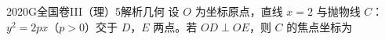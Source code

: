 
\begin{problem}{2020}{G}{全国卷III（理）}{5}{解析几何}
设 $ O $ 为坐标原点，直线 $ x = 2 $ 与抛物线 $ C $：$ y^2 = 2px $（$ p > 0 $）交于 $ D $，$ E $ 两点。若 $ OD \perp OE $，则 $ C $ 的焦点坐标为
\begin{choices}
\end{choices}
\end{problem}

\begin{answer}

\end{answer}

\begin{solutions}

\end{solutions}
